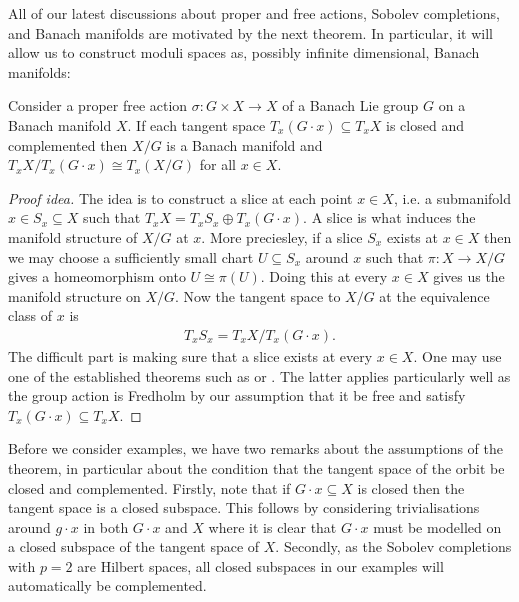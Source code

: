 \documentclass[12pt]{ociamthesis}  %
\begin{document}
All of our latest discussions about proper and free actions, Sobolev
completions, and Banach manifolds are motivated by the next theorem.
In particular, it will allow us to construct moduli spaces as, possibly
infinite dimensional, Banach manifolds:

\begin{theorem}\label{thm:banach_quotient}
  Consider a proper free action $\sigma : G\times X\to X$ of a Banach
  Lie group $G$ on a Banach manifold $X$. If each tangent space
  $T_x(G\cdot x) \subseteq T_x X$ is closed and complemented then
  $X/G$ is a Banach manifold and $T_x X/T_x (G\cdot x) \cong T_x(X/G)$
  for all $x\in X$.
  \begin{proof}[Proof idea]
    The idea is to construct a slice at each point $x\in X$, i.e. a submanifold
    $x\in S_x\subseteq X$ such that $T_x X = T_xS_x \oplus T_x(G\cdot x)$. A slice is
    what induces the manifold structure of $X/G$ at $x$. More preciesley, if a slice
    $S_x$ exists at $x\in X$ then we may choose a sufficiently small chart $U\subseteq S_x$
    around $x$ such that $\pi : X \to X/G$ gives a homeomorphism onto $U\cong\pi(U)$. Doing this
    at every $x\in X$ gives us the manifold structure on $X/G$. Now the tangent space
    to $X/G$ at the equivalence class of $x$ is
    \begin{align}\label{eq:banach_quotient_tangent}
      T_x S_x = T_x X / T_x (G\cdot x).
    \end{align}
    The difficult part is making sure that a slice exists at every $x\in X$. One may use
    one of the established theorems such as \cite[Theorem 3.28]{diez2019}
    or \cite[Theorem 5.2.6]{palais1992}. The latter applies particularly well
    as the group action is Fredholm by our assumption that it be free and satisfy
    $T_x(G\cdot x)\subseteq T_x X$.
  \end{proof}
\end{theorem}

Before we consider examples, we have two remarks about the assumptions of the theorem,
in particular about the condition that the tangent space of the orbit be closed and
complemented. Firstly, note that if $G\cdot x \subseteq X$ is closed then the tangent
space is a closed subspace. This follows by considering trivialisations around $g\cdot x$
in both $G\cdot x$ and $X$ where it is clear that $G\cdot x$ must be modelled on a closed
subspace of the tangent space of $X$. Secondly, as the Sobolev completions with $p=2$ are
Hilbert spaces, all closed subspaces in our examples will automatically be complemented.
\end{document}
